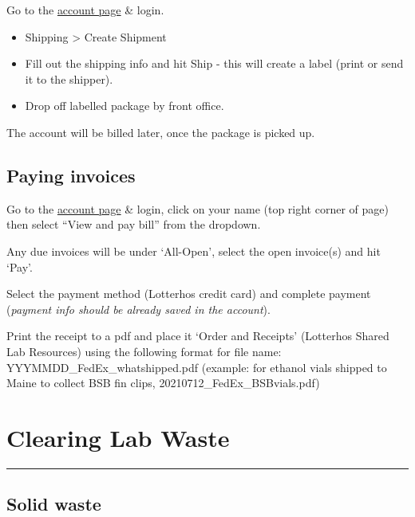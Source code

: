 \documentclass[
  letterpaper,
  DIV=11,
  numbers=noendperiod]{scrreprt}
\begin{document}
Go to the
\href{https://www.fedex.com/shipping/shipEntryAction.do?method=doEntry\&link=1\&locale=en_US\&urlparams=us\&sType=FShipping}{account
page} \& login.

\begin{itemize}
\item
  Shipping \textgreater{} Create Shipment
\item
  Fill out the shipping info and hit Ship - this will create a label
  (print or send it to the shipper).
\item
  Drop off labelled package by front office.
\end{itemize}

The account will be billed later, once the package is picked up.

\hypertarget{paying-invoices}{%
\section*{\texorpdfstring{\textbf{Paying
invoices}}{Paying invoices}}\label{paying-invoices}}

Go to the \href{https://www.fedex.com/en-us/home.html}{account page} \&
login, click on your name (top right corner of page) then select ``View
and pay bill'' from the dropdown.

Any due invoices will be under `All-Open', select the open invoice(s)
and hit `Pay'.

Select the payment method (Lotterhos credit card) and complete payment
(\emph{payment info should be already saved in the account}).

Print the receipt to a pdf and place it `Order and Receipts' (Lotterhos
Shared Lab Resources) using the following format for file name:
YYYMMDD\_FedEx\_whatshipped.pdf (example: for ethanol vials shipped to
Maine to collect BSB fin clips, 20210712\_FedEx\_BSBvials.pdf)\\

\hypertarget{clearing-lab-waste}{%
\chapter{Clearing Lab Waste}\label{clearing-lab-waste}}

\begin{center}\rule{0.5\linewidth}{0.5pt}\end{center}

\hypertarget{solid-waste}{%
\section*{\texorpdfstring{\textbf{Solid
waste}}{Solid waste}}\label{solid-waste}}
\end{document}

